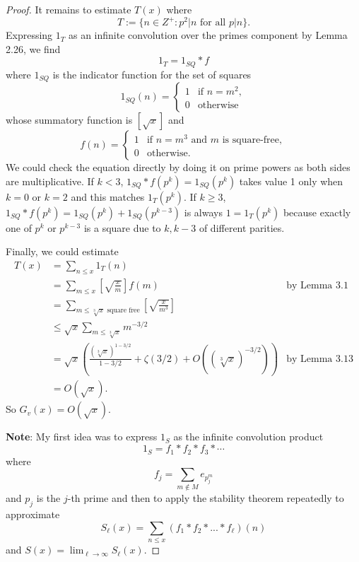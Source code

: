 \documentclass[12pt]{article}
\begin{document}
\begin{proof}
It remains to estimate $T(x)$ where
$$T := \{n \in Z^+ : p^2 | n \text{ for all } p | n\}.$$
Expressing $1_T$ as an infinite convolution over the primes component by Lemma 2.26, we find
$$1_T = 1_{SQ} * f$$
where $1_{SQ}$ is the indicator function for the set of squares
$$1_{SQ}(n) = \begin{cases}
1 &\text{if } n = m^2,\\
0 &\text{otherwise}
\end{cases}$$
whose summatory function is $[\sqrt{x}]$ and
$$f(n) = \begin{cases}
1 &\text{if } n = m^3 \text{ and } m \text{ is square-free},\\
0 &\text{otherwise}.
\end{cases}$$
We could check the equation directly by doing it on prime powers as both sides are multiplicative. If $k < 3$, $1_{SQ} * f(p^k) = 1_{SQ}(p^k)$ takes value 1 only when $k = 0$ or $k = 2$ and this matches $1_T(p^k)$. If $k \geq 3$, $1_{SQ} * f(p^k) = 1_{SQ}(p^k) + 1_{SQ}(p^{k-3})$ is always $1 = 1_T(p^k)$ because exactly one of $p^k$ or $p^{k-3}$ is a square due to $k, k - 3$ of different parities.

Finally, we could estimate
\begin{align*}
T(x) &= \sum_{n \leq x} 1_T(n)\\
&= \sum_{m \leq x} \left[\sqrt{\frac{x}{m}}\right] f(m) &\text{by Lemma 3.1}\\
&= \sum_{m \leq \sqrt[3]{x} \text{ square free}} \left[\sqrt{\frac{x}{m^3}}\right]\\
&\leq \sqrt{x} \sum_{m \leq \sqrt[3]{x}} m^{-3/2}\\
&= \sqrt{x} \left( \frac{(\sqrt[3]{x})^{1 - 3/2}}{1 - 3/2} + \zeta(3/2) + O((\sqrt[3]{x})^{-3/2}) \right) &\text{by Lemma 3.13}\\
&= O(\sqrt{x}).
\end{align*}
So $G_v(x) = O(\sqrt{x})$.

\textbf{Note}: My first idea was to express $1_S$ as the infinite convolution product
$$1_S = f_1 * f_2 * f_3 * \cdots$$
where
$$f_j = \sum_{m \not\in M} e_{p_j^m}$$
and $p_j$ is the $j$-th prime and then to apply the stability theorem repeatedly to approximate
$$S_\ell(x) = \sum_{n \leq x} (f_1 * f_2 * ... * f_\ell) (n)$$
and $S(x) = \lim_{\ell \rightarrow \infty} S_\ell(x)$.


\end{proof}
\end{document}
